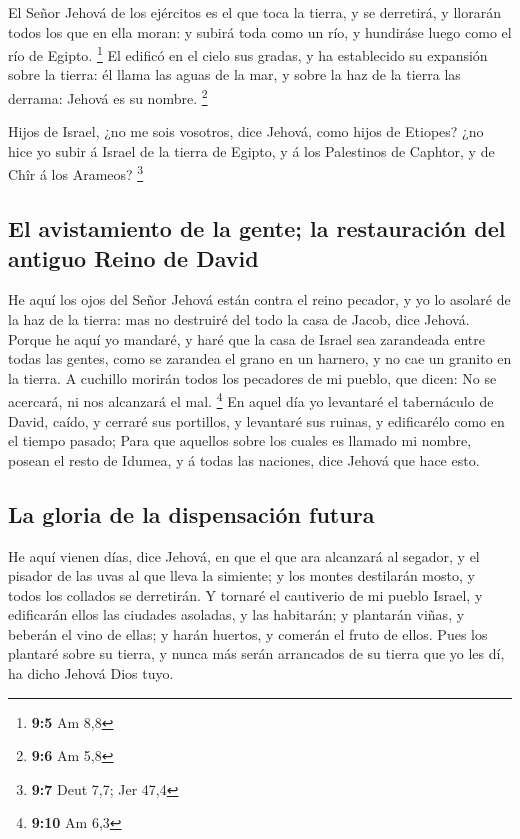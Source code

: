  El Señor Jehová de los ejércitos es el que toca la
tierra, y se derretirá, y llorarán todos los que en ella moran: y subirá
toda como un río, y hundiráse luego como el río de Egipto. \footnote{\textbf{9:5}
  Am 8,8}  El edificó en el cielo sus gradas, y ha
establecido su expansión sobre la tierra: él llama las aguas de la mar,
y sobre la haz de la tierra las derrama: Jehová es su nombre.
\footnote{\textbf{9:6} Am 5,8}

 Hijos de Israel, ¿no me sois vosotros, dice Jehová, como
hijos de Etiopes? ¿no hice yo subir á Israel de la tierra de Egipto, y á
los Palestinos de Caphtor, y de Chîr á los Arameos? \footnote{\textbf{9:7}
  Deut 7,7; Jer 47,4}

\hypertarget{el-avistamiento-de-la-gente-la-restauraciuxf3n-del-antiguo-reino-de-david}{%
\subsection{El avistamiento de la gente; la restauración del antiguo
Reino de
David}\label{el-avistamiento-de-la-gente-la-restauraciuxf3n-del-antiguo-reino-de-david}}

 He aquí los ojos del Señor Jehová están contra el reino
pecador, y yo lo asolaré de la haz de la tierra: mas no destruiré del
todo la casa de Jacob, dice Jehová.  Porque he aquí yo
mandaré, y haré que la casa de Israel sea zarandeada entre todas las
gentes, como se zarandea el grano en un harnero, y no cae un granito en
la tierra.  A cuchillo morirán todos los pecadores de mi
pueblo, que dicen: No se acercará, ni nos alcanzará el mal. \footnote{\textbf{9:10}
  Am 6,3}  En aquel día yo levantaré el tabernáculo de
David, caído, y cerraré sus portillos, y levantaré sus ruinas, y
edificarélo como en el tiempo pasado;  Para que aquellos
sobre los cuales es llamado mi nombre, posean el resto de Idumea, y á
todas las naciones, dice Jehová que hace esto.

\hypertarget{la-gloria-de-la-dispensaciuxf3n-futura}{%
\subsection{La gloria de la dispensación
futura}\label{la-gloria-de-la-dispensaciuxf3n-futura}}

 He aquí vienen días, dice Jehová, en que el que ara
alcanzará al segador, y el pisador de las uvas al que lleva la simiente;
y los montes destilarán mosto, y todos los collados se derretirán.
 Y tornaré el cautiverio de mi pueblo Israel, y
edificarán ellos las ciudades asoladas, y las habitarán; y plantarán
viñas, y beberán el vino de ellas; y harán huertos, y comerán el fruto
de ellos.  Pues los plantaré sobre su tierra, y nunca más
serán arrancados de su tierra que yo les dí, ha dicho Jehová Dios tuyo.

